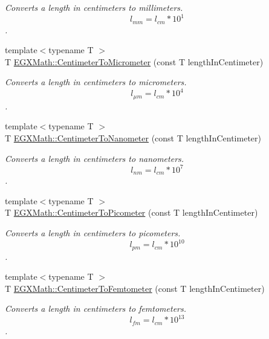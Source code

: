 \begin{DoxyCompactItemize}
\begin{DoxyCompactList}\small\item\em Converts a length in centimeters to millimeters. \[ l_{mm}=l_{cm} * 10^{1} \]. \end{DoxyCompactList}\item 
{\footnotesize template$<$typename T $>$ }\\T \mbox{\hyperlink{group___e_g_x_math-_conversions-_length_conversions-_centimeter-_s_i_gaa05fd2c1b2c9ab2ac8aa7f1ef8be612a}{E\+G\+X\+Math\+::\+Centimeter\+To\+Micrometer}} (const T length\+In\+Centimeter)
\begin{DoxyCompactList}\small\item\em Converts a length in centimeters to micrometers. \[ l_{\mu m}=l_{cm} * 10^{4} \]. \end{DoxyCompactList}\item 
{\footnotesize template$<$typename T $>$ }\\T \mbox{\hyperlink{group___e_g_x_math-_conversions-_length_conversions-_centimeter-_s_i_gacf80778df778af3266027dbe32bfd2d4}{E\+G\+X\+Math\+::\+Centimeter\+To\+Nanometer}} (const T length\+In\+Centimeter)
\begin{DoxyCompactList}\small\item\em Converts a length in centimeters to nanometers. \[ l_{nm}=l_{cm} * 10^{7} \]. \end{DoxyCompactList}\item 
{\footnotesize template$<$typename T $>$ }\\T \mbox{\hyperlink{group___e_g_x_math-_conversions-_length_conversions-_centimeter-_s_i_ga7e2851b0052f1b135a84aa860495e4ba}{E\+G\+X\+Math\+::\+Centimeter\+To\+Picometer}} (const T length\+In\+Centimeter)
\begin{DoxyCompactList}\small\item\em Converts a length in centimeters to picometers. \[ l_{pm}=l_{cm} * 10^{10} \]. \end{DoxyCompactList}\item 
{\footnotesize template$<$typename T $>$ }\\T \mbox{\hyperlink{group___e_g_x_math-_conversions-_length_conversions-_centimeter-_s_i_ga1d86301dcf9e8d9d75127c3d998f9c0b}{E\+G\+X\+Math\+::\+Centimeter\+To\+Femtometer}} (const T length\+In\+Centimeter)
\begin{DoxyCompactList}\small\item\em Converts a length in centimeters to femtometers. \[ l_{fm}=l_{cm} * 10^{13} \]. \end{DoxyCompactList}\item 

\end{DoxyCompactItemize}
